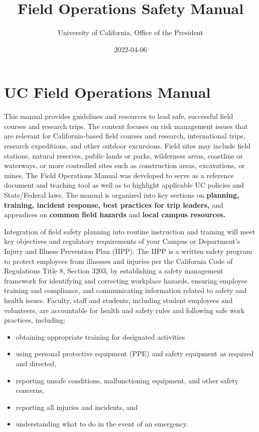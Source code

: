 \documentclass[
]{book}
\title{Field Operations Safety Manual}
\author{University of California, Office of the President}
\date{2022-04-06}
\providecommand{\tightlist}{%
  \setlength{\itemsep}{0pt}\setlength{\parskip}{0pt}}
\begin{document}
\maketitle

{
\setcounter{tocdepth}{1}
\tableofcontents
}
\hypertarget{uc-field-operations-manual}{%
\chapter*{UC Field Operations Manual}\label{uc-field-operations-manual}}

This manual provides guidelines and resources to lead safe, successful field courses and research trips. The content focuses on risk management issues that are relevant for California-based field courses and research, international trips, research expeditions, and other outdoor excursions. Field sites may include field stations, natural reserves, public lands or parks, wilderness areas, coastline or waterways, or more controlled sites such as construction areas, excavations, or mines. The Field Operations Manual was developed to serve as a reference document and teaching tool as well as to highlight applicable UC policies and State/Federal laws. The manual is organized into key sections on \textbf{planning, training, incident response, best practices for trip leaders,} and appendices on \textbf{common field hazards} and \textbf{local campus resources.}

Integration of field safety planning into routine instruction and training will meet key objectives and regulatory requirements of your Campus or Department's Injury and Illness Prevention Plan (IIPP). The IIPP is a written safety program to protect employees from illnesses and injuries per the California Code of Regulations Title 8, Section 3203, by establishing a safety management framework for identifying and correcting workplace hazards, ensuring employee training and compliance, and communicating information related to safety and health issues. Faculty, staff and students, including student employees and volunteers, are accountable for health and safety rules and following safe work practices, including:

\begin{itemize}
\tightlist
\item
  obtaining appropriate training for designated activities
\item
  using personal protective equipment (PPE) and safety equipment as required and directed,
\item
  reporting unsafe conditions, malfunctioning equipment, and other safety concerns,
\item
  reporting all injuries and incidents, and
\item
  understanding what to do in the event of an emergency.
\end{itemize}
\end{document}
